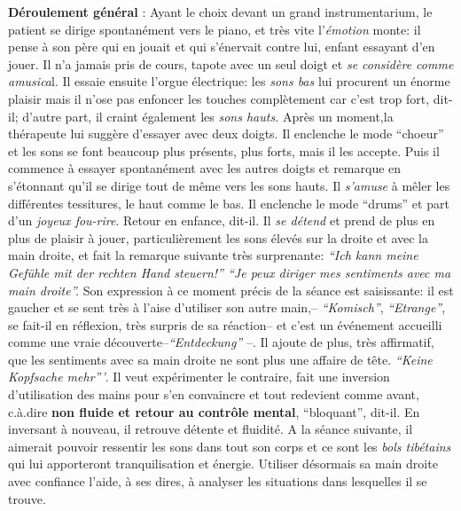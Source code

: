  	 \textbf{Déroulement général} :
Ayant le choix devant un grand instrumentarium,
        le patient se dirige spontanément vers le piano, et très vite
        l'\textit{émotion} monte: il pense à son père qui en jouait et qui
        s'énervait contre lui, enfant essayant d'en
        jouer. Il n'a jamais pris de cours, tapote avec un seul doigt et \textit{se considère comme
        amusica}l. Il essaie ensuite l'orgue électrique: les \textit{sons bas}
        lui procurent un énorme plaisir mais il n'ose pas enfoncer les touches
        complètement car c'est trop fort, dit-il; d'autre part, il
        craint également les
        \textit{sons hauts.}
        Après un moment,la thérapeute lui suggère d'essayer avec deux doigts.
        Il enclenche le mode ``choeur'' et les sons se font beaucoup
        plus présents, plus forts, mais il les accepte. Puis il commence à essayer spontanément
        avec les autres doigts et remarque en s'étonnant qu'il se
        dirige tout de même vers les sons
        hauts. Il \textit{s'amuse} à mêler les différentes tessitures,
        le haut comme le bas.
        Il enclenche le mode ``drums'' et part d'un\textit{ joyeux
        fou-rire}. Retour en enfance, dit-il.
        Il \textit{se détend} et prend de plus en plus de plaisir à jouer, particulièrement  les sons élevés
        sur la droite et avec la main droite, et fait
        la remarque suivante très surprenante:
        \textit{``Ich kann meine Gefühle mit der rechten Hand steuern!''
        ``Je peux diriger mes sentiments avec ma main droite''.}
 Son expression à ce moment précis de la séance est saisissante: il
        est gaucher et se sent très à l'aise d'utiliser son autre
        main,-- \textit{``Komisch''},  \textit{``Etrange''}, se fait-il
        en réflexion, très surpris de sa réaction-- et c'est un événement
        accueilli comme une vraie
        découverte--\textit{``Entdeckung''} --.
        Il ajoute de plus, très affirmatif, que les sentiments avec sa main
        droite ne sont plus une affaire de tête. \textit{``Keine
        Kopfsache mehr'''}. Il veut expérimenter le contraire, fait
      une inversion d'utilisation des mains pour s'en convaincre et tout redevient comme
        avant, c.à.dire \textbf{non fluide et retour au contrôle
          mental},
        ``bloquant'', dit-il. En inversant à nouveau, il retrouve
        détente et fluidité.
        A la séance suivante, il aimerait pouvoir ressentir
        les sons dans tout son corps et ce sont les\textit{ bols
          tibétains } qui lui
        apporteront tranquilisation et
        énergie. Utiliser désormais sa main
        droite avec confiance l'aide, à ses dires, à analyser les
        situations dans lesquelles il se trouve.

